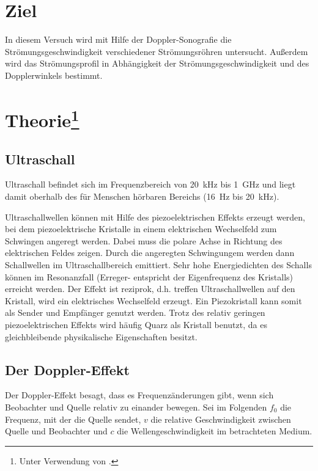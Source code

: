 \section{Ziel}
In diesem Versuch wird mit Hilfe der Doppler-Sonografie die Strömungsgeschwindigkeit verschiedener 
Strömungsröhren untersucht.
Außerdem wird das Strömungsprofil in Abhängigkeit der Strömungsgeschwindigkeit und des Dopplerwinkels bestimmt.




\section[Theorie]{Theorie\footnote[1]{Unter Verwendung von \cite{man:us3}.}}
\subsection{Ultraschall}
Ultraschall befindet sich im Frequenzbereich von \qty{20}{\kilo\hertz} bis \qty{1}{\giga\hertz} und liegt damit oberhalb des für Menschen
hörbaren Bereichs (\qty{16}{\hertz} bis \qty{20}{\kilo\hertz}).

\noindent
Ultraschallwellen können mit Hilfe des piezoelektrischen Effekts erzeugt werden,
bei dem piezoelektrische Kristalle in einem elektrischen Wechselfeld zum Schwingen angeregt werden.
Dabei muss die polare Achse in Richtung des elektrischen Feldes zeigen.
Durch die angeregten Schwingungem werden dann Schallwellen im Ultraschallbereich emittiert.
Sehr hohe Energiedichten des Schalls können im Resonanzfall (Erreger- entspricht der Eigenfrequenz des Kristalls) erreicht werden.
Der Effekt ist reziprok, d.h. treffen Ultraschallwellen auf den Kristall, wird ein elektrisches Wechselfeld erzeugt.
Ein Piezokristall kann somit als Sender und Empfänger genutzt werden.
Trotz des relativ geringen piezoelektrischen Effekts wird häufig Quarz als Kristall benutzt, da es gleichbleibende physikalische 
Eigenschaften besitzt.




\subsection{Der Doppler-Effekt}
Der Doppler-Effekt besagt, dass es Frequenzänderungen gibt, wenn sich Beobachter und Quelle relativ zu einander bewegen.
Sei im Folgenden $f_0$ die Frequenz, mit der die Quelle sendet, $v$ die relative Geschwindigkeit zwischen Quelle und Beobachter
und $c$ die Wellengeschwindigkeit im betrachteten Medium.

